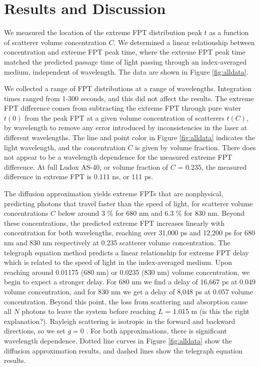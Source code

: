 \documentclass[floatfix,aps,prl,reprint,groupedaddress]{revtex4-2}
\begin{document}
\section{Results and Discussion}

We measured the location of the extreme FPT distribution peak $t$ as a function of scatterer volume concentration $C$. We determined a linear relationship between concentration and extreme FPT peak time, where the extreme FPT peak time matched the predicted passage time of light passing through an index-averaged medium, independent of wavelength. The data are shown in Figure \ref{fig:alldata}.

We collected a range of FPT distributions at a range of wavelengths. Integration times ranged from 1-300 seconds, and this did not affect the results. The extreme FPT difference comes from subtracting the extreme FPT through pure water $t\left(0\right)$ from the peak FPT at a given volume concentration of scatterers $t\left(C\right)$, by wavelength to remove any error introduced by inconsistencies in the laser at different wavelengths. The line and point color in Figure \ref{fig:alldata} indicates the light wavelength, and the concentration $C$ is given by volume fraction. There does not appear to be a wavelength dependence for the measured extreme FPT difference. At full Ludox AS-40, or volume fraction of $C$ = 0.235, the measured difference in extreme FPT is 0.111 ns, or 111 ps. 

The diffusion approximation yields extreme FPTs that are nonphysical, predicting photons that travel faster than the speed of light, for scatterer volume concentrations $C$ below around 3 \% for 680 nm and 6.3 \% for 830 nm. Beyond these concentrations, the predicted extreme FPT increases linearly with concentration for both wavelengths, reaching over 31,000 ps and 12,200 ps for 680 nm and 830 nm respectively at 0.235 scatterer volume concentration. 
The telegraph equation method predicts a linear relationship for extreme FPT delay which is related to the speed of light in the index-averaged medium. Upon reaching around 0.01175 (680 nm) or 0.0235 (830 nm) volume concentration, we begin to expect a stronger delay. For 680 nm we find a delay of 16,667 ps at 0.049 volume concentration, and for 830 nm we get a delay of 8,048 ps at 0.057 volume concentration. Beyond this point, the loss from scattering and absorption cause all $N$ photons to leave the system before reaching $L$ = 1.015 m {\color{violet}(is this the right explanation?)}. Rayleigh scattering is isotropic in the forward and backward directions, so we set $g=0$ \cite{bohren_absorption_1983}. For both approximations, there is significant wavelength dependence. Dotted line curves in Figure \ref{fig:alldata} show the diffusion approximation results, and dashed lines show the telegraph equation results.
\end{document}

